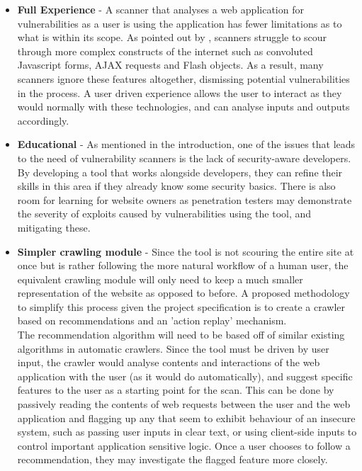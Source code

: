 \begin{itemize}
	\item \textbf{Full Experience} - A scanner that analyses a web application for vulnerabilities as a user is using the application has fewer limitations as to what is within its scope. As pointed out by \cite{whyJohnnyCantPentest}, scanners struggle to scour through more complex constructs of the internet such as convoluted Javascript forms, AJAX requests and Flash objects. As a result, many scanners ignore these features altogether, dismissing potential vulnerabilities in the process. A user driven experience allows the user to interact as they would normally with these technologies, and can analyse inputs and outputs accordingly. \\
	
	\item \textbf{Educational} - As mentioned in the introduction, one of the issues that leads to the need of vulnerability scanners is the lack of security-aware developers. By developing a tool that works alongside developers, they can refine their skills in this area if they already know some security basics. There is also room for learning for website owners as penetration testers may demonstrate the severity of exploits caused by vulnerabilities using the tool, and mitigating these. \\
	
	\item \textbf{Simpler crawling module} - Since the tool is not scouring the entire site at once but is rather following the more natural workflow of a human user, the equivalent crawling module will only need to keep a much smaller representation of the website as opposed to before. A proposed methodology to simplify this process given the project specification is to create a crawler based on recommendations and an 'action replay' mechanism. \\
	
	The recommendation algorithm will need to be based off of similar existing algorithms in automatic crawlers. Since the tool must be driven by user input, the crawler would analyse contents and interactions of the web application with the user (as it would do automatically), and suggest specific features to the user as a starting point for the scan. This can be done by passively reading the contents of web requests between the user and the web application and flagging up any that seem to exhibit behaviour of an insecure system, such as passing user inputs in clear text, or using client-side inputs to control important application sensitive logic. Once a user chooses to follow a recommendation, they may investigate the flagged feature more closely. \\
	

\end{itemize}
